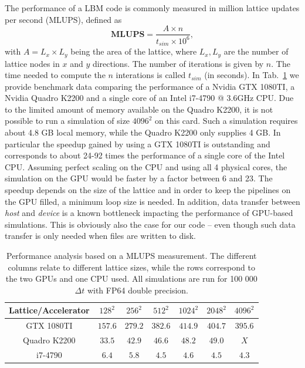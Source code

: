The performance of a LBM code is commonly measured in million lattice updates per second (MLUPS), defined as
\begin{equation}
    \textbf{MLUPS}=\frac{A\times n}{t_{sim}\times 10^6},
\end{equation}
with $A=L_x\times L_y$ being the area of the lattice, where $L_x,L_y$ are the number of lattice nodes in $x$ and $y$ directions. 
The number of iterations is given by $n$. 
The time needed to compute the $n$ interations is called $t_{sim}$ (in seconds).
In Tab.~\ref{tab:efficiency} we provide benchmark data comparing the performance of a Nvidia GTX 1080TI, a Nvidia Quadro K2200 and a single core of an Intel i7-4790 @ 3.6GHz CPU.
Due to the limited amount of memory available on the Quadro K2200, it is not possible to run a simulation of size $4096^2$ on this card. 
Such a simulation requires about 4.8 GB local memory, while the Quadro K2200 only supplies 4 GB. 
In particular the speedup gained by using a GTX 1080TI is outstanding and corresponds to about 24-92 times the performance of a single core of the Intel CPU.
Assuming perfect scaling on the CPU and using all 4 physical cores, the simulation on the GPU would be faster by a factor between 6 and 23. 
The speedup depends on the size of the lattice and in order to keep the pipelines on the GPU filled, a minimum loop size is needed. 
In addition, data transfer between \textit{host} and \textit{device} is a known bottleneck impacting the performance of GPU-based simulations. 
This is obviously also the case for our code -- even though such data transfer is only needed when files are written to disk.
 
\begin{table}
 \centering
 \caption{Performance analysis based on a MLUPS measurement. 
 The different columns relate to different lattice sizes, while the rows correspond to the two GPUs and one CPU used. 
 All simulations are run for 100 000$\Delta t$ with FP64 double precision.}
 \begin{tabular}{|c|c c c c c c |}
 \hline
  Lattice/Accelerator & $128^2$ & $256^2$ & $512^2$ & $1024^2$ & $2048^2$ & $4096^2$ \\ \hline
  GTX 1080TI & $157.6$ & $279.2$ & $382.6$ & $414.9$ & $404.7$ & $395.6$ \\ \hline
  Quadro K2200 & $33.5$ & $42.9$ & $46.6$ & $48.2$ & $49.0$ & $X$ \\ \hline
  i7-4790 & $6.4$ & $5.8$ & $4.5$ & $4.6$ & $4.5$ & $4.3$ \\
  \hline
 \end{tabular}
 \label{tab:efficiency}
 \end{table}

